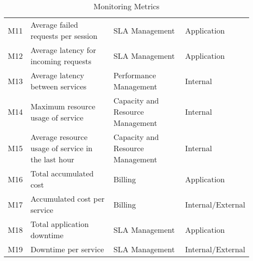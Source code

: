 \begin{table}[]
\begin{tabular}{llll}
M11 & Average failed requests per session                & SLA Management                   & Application                             \\
M12 & Average latency for incoming requests              & SLA Management                   & Application                             \\
M13 & Average latency between services                   & Performance Management           & Internal                                \\
M14 & Maximum resource usage of service                  & Capacity and Resource Management & Internal                                \\
M15 & Average resource usage of service in the last hour & Capacity and Resource Management & Internal                                \\
M16 & Total accumulated cost                             & Billing                          & Application                             \\
M17 & Accumulated cost per service                       & Billing                          & Internal/External                       \\
M18 & Total application downtime                         & SLA Management                   & Application                             \\
M19 & Downtime per service                               & SLA Management                   & Internal/External                      
\end{tabular}
\caption{Monitoring Metrics}
\label{tab:monitoring_metrics}
\end{table}